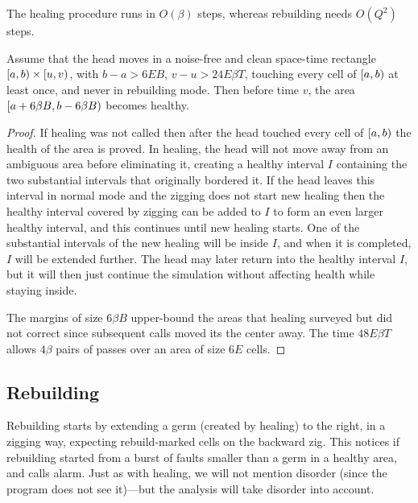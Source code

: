 \documentclass[11pt]{memoir}
\theoremstyle{definition} %
\def\B{B}
\newcommand{\E}{E} %
\newcommand{\Q}{Q} %
\newcommand{\Tu}{T}
\begin{document}
The healing procedure runs in \( O(\beta) \) 
steps, whereas rebuilding needs \( O(\Q^{2}) \) steps.

\begin{lemma}\label{lem:combined-heals}
  Assume that the head moves in a noise-free and clean space-time rectangle
  \( \left[a,b\right)\times \left[u,v\right) \), with \( b-a>6\E\B \), \( v-u>24\E\beta\Tu \),
touching every cell of \( \left[a,b\right) \) at least once, and never in rebuilding mode.
Then before time \( v \), the area \( \lint{a+6\beta\B}{b-6\beta\B} \) becomes healthy.
\end{lemma}
\begin{proof}
  If healing was not called then after the head touched every cell of \( \left[a,b\right) \) the
  health of the area is proved.
  In healing, the head will not move away from an ambiguous area before eliminating it,
  creating a healthy interval
  \( I \) containing the two substantial intervals that originally bordered it.
  If the head leaves this interval in normal mode and the zigging does not start new healing then the
  healthy interval covered by zigging can be added to \( I \) to form an even larger healthy interval,
  and this continues until new healing starts.
  One of the substantial intervals of the new healing will be inside \( I \), and when it is completed,
  \( I \) will be extended further.
  The head may later return into the healthy interval \( I \),
  but it will then just continue the simulation without
  affecting health while staying inside.

  The margins of size \( 6\beta\B \) upper-bound the areas that healing surveyed but did not
  correct since subsequent calls moved its the center away.
  The time \( 48\E\beta\Tu \) allows \( 4\beta \) pairs of passes over an area of size \( 6\E \) cells.
\end{proof}

\subsection{Rebuilding}\label{sec:rebuilding}

Rebuilding starts by extending a germ (created by healing) to the right, in a zigging way,
expecting rebuild-marked cells on the backward zig.
This notices if rebuilding started from a burst of faults smaller than a germ
in a healthy area, and calls alarm.
Just as with healing, we will not mention disorder (since the program does not see it)---but
the analysis will take disorder into account.
\end{document}
